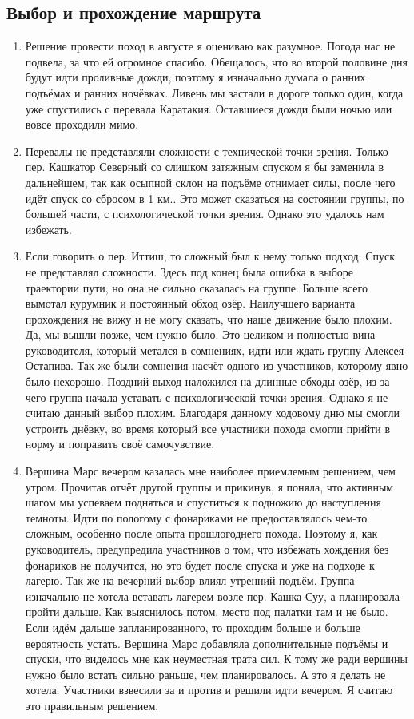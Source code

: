 \subsection{Выбор и прохождение маршрута}  
	\begin{enumerate}
		\item  Решение провести поход в августе я оцениваю как разумное. Погода нас не подвела, за что ей огромное спасибо. Обещалось, что во второй половине дня будут идти проливные дожди, поэтому я изначально думала о ранних подъёмах и ранних ночёвках. Ливень мы застали в дороге только один, когда уже спустились с перевала Каратакия. Оставшиеся дожди были ночью или вовсе проходили мимо. 
		\item Перевалы не представляли сложности с технической точки зрения. Только пер. Кашкатор Северный со слишком затяжным спуском я бы заменила в дальнейшем, так как осыпной склон на подъёме отнимает силы, после чего идёт спуск со сбросом в 1 км.. Это может сказаться на состоянии группы, по большей части, с психологической точки зрения. Однако это удалось нам избежать. 
		\item Если говорить о пер. Иттиш, то сложный был к нему только подход. Спуск не представлял сложности. Здесь под конец была ошибка в выборе траектории пути, но она не сильно сказалась на группе. Больше всего вымотал курумник и постоянный обход озёр. Наилучшего варианта прохождения не вижу и не могу сказать, что наше движение было плохим. Да, мы вышли позже, чем нужно было. Это целиком и полностью вина руководителя, который метался в сомнениях, идти или ждать группу Алексея Остапива.  Так же были сомнения насчёт одного из участников, которому явно было нехорошо. Поздний выход наложился на длинные обходы озёр, из-за чего группа начала уставать с психологической точки зрения. Однако я не считаю данный выбор плохим. Благодаря данному ходовому дню мы смогли устроить днёвку, во время который все участники похода смогли прийти в норму и поправить своё самочувствие. 
		\item Вершина Марс вечером казалась мне наиболее приемлемым решением, чем утром. Прочитав отчёт другой группы и прикинув, я поняла, что активным шагом мы успеваем подняться и спуститься к подножию до наступления темноты. Идти по пологому с фонариками не предоставлялось чем-то сложным, особенно после опыта прошлогоднего похода. Поэтому я, как руководитель, предупредила участников о том, что избежать хождения без фонариков не получится, но это будет после спуска и уже на подходе к лагерю. Так же на вечерний выбор влиял утренний подъём. Группа изначально не хотела вставать лагерем возле пер. Кашка-Суу, а планировала пройти дальше. Как выяснилось потом, место под палатки  там и не было. Если идём дальше запланированного, то проходим больше и больше вероятность устать. Вершина Марс добавляла дополнительные подъёмы и спуски, что виделось мне как неуместная трата сил. К тому же ради вершины нужно было встать сильно раньше, чем планировалось. А это я делать не хотела.  Участники взвесили за и против и решили идти вечером. Я считаю это правильным решением.

\end{enumerate}
